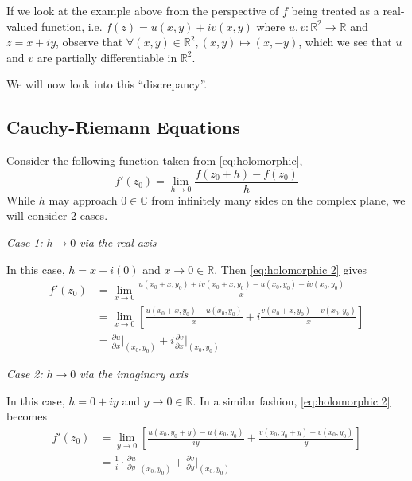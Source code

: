 \documentclass[notoc,notitlepage]{tufte-book}
\begin{document}
\begin{note}
	If we look at the example above from the perspective of $f$ being treated as a real-valued function, i.e. $f(z) = u(x, y) + iv(x, y)$ where $u, v: \mathbb{R}^2 \to \mathbb{R}$ and $z = x + iy$, observe that $\forall (x, y) \in \mathbb{R}^2, (x, y) \mapsto (x, -y)$, which we see that $u$ and $v$ are partially differentiable in $\mathbb{R}^2$.

	We will now look into this ``discrepancy''.
\end{note}

\subsection{Cauchy-Riemann Equations} %
\label{sub:cauchy_riemann_equations}


Consider the following function taken from \cref{eq:holomorphic},
\begin{equation}\label{eq:holomorphic 2}
	f'(z_0) = \lim_{h \to 0} \frac{f(z_0 + h) - f(z_0)}{h}
\end{equation}
While $h$ may approach $0 \in \mathbb{C}$ from infinitely many sides on the complex plane, we will consider 2 cases.

\textit{Case 1: }$\mathit{h \to 0}$\textit{ via the real axis}

In this case, $h = x + i(0)$ and $x \to 0 \in \mathbb{R}$. Then \cref{eq:holomorphic 2} gives
\begin{align}
	f'(z_0) &= \lim_{x \to 0} \frac{u(x_0 + x, y_0) + iv(x_0 + x, y_0) - u(x_0, y_0) - iv(x_0, y_0)}{x} \nonumber \\
		&= \lim_{x \to 0} \left[ \frac{u(x_0 + x, y_0) - u(x_0, y_0)}{x} + i \frac{v(x_0 + x, y_0) - v(x_0, y_0)}{x} \right] \nonumber \\
		&= \frac{\partial u}{\partial x} \Bigr|_{(x_0, y_0)} + i \frac{\partial v}{\partial x} \Bigr|_{(x_0, y_0)} \label{eq:holomorphic approach via real axis}
\end{align}

\textit{Case 2: }$\mathit{h \to 0}$\textit{ via the imaginary axis}

In this case, $h = 0 + iy$ and $y \to 0 \in \mathbb{R}$. In a similar fashion, \cref{eq:holomorphic 2} becomes
\begin{align}
	f'(z_0) &= \lim_{y \to 0} \left[ \frac{u(x_0, y_0 + y) - u(x_0, y_0)}{iy} + \frac{v(x_0, y_0 + y) - v(x_0, y_0)}{y} \right] \nonumber \\
		&= \frac{1}{i} \cdot \frac{\partial u}{\partial y} \Bigr|_{(x_0, y_0)} + \frac{\partial v}{\partial y} \Bigr|_{(x_0, y_0)} \label{eq:holomorphic approach via imaginary axis}
\end{align}
\end{document}
